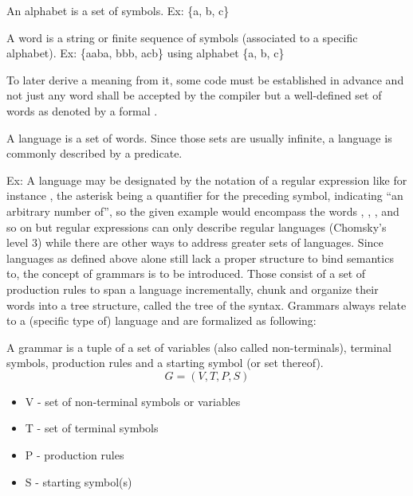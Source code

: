 \begin{definition}
	An alphabet is a set of symbols. Ex: \{a, b, c\}
\end{definition}

\begin{definition}
	A word is a string or finite sequence of symbols (associated to a specific alphabet). Ex: \{aaba, bbb, acb\} using alphabet \{a, b, c\}
\end{definition}

To later derive a meaning from it, some code must be established in advance and not just any word shall be accepted by the compiler but a well-defined set of words as denoted by a formal .

\begin{definition}
	A language is a set of words. Since those sets are usually infinite, a language is commonly described by a predicate.
\end{definition}

Ex: A language may be designated by the notation of a regular expression like for instance , the asterisk being a quantifier for the preceding symbol, indicating ``an arbitrary number of'', so the given example would encompass the words , , ,  and so on but regular expressions can only describe regular languages (Chomsky's level 3) while there are other ways to address greater sets of languages. Since languages as defined above alone still lack a proper structure to bind semantics to, the concept of grammars is to be introduced. Those consist of a set of production rules to span a language incrementally, chunk and organize their words into a tree structure, called the tree of the syntax. Grammars always relate to a (specific type of) language and are formalized as following:

\begin{definition}
	A grammar is a tuple of a set of variables (also called non-terminals), terminal symbols, production rules and a starting symbol (or set thereof).
	\[G = (V, T, P, S)\]
	
	\begin{itemize}
	\item	V - set of non-terminal symbols or variables
	\item	T - set of terminal symbols
	\item	P - production rules
	\item	S - starting symbol(s)
	\end{itemize}
\end{definition}

